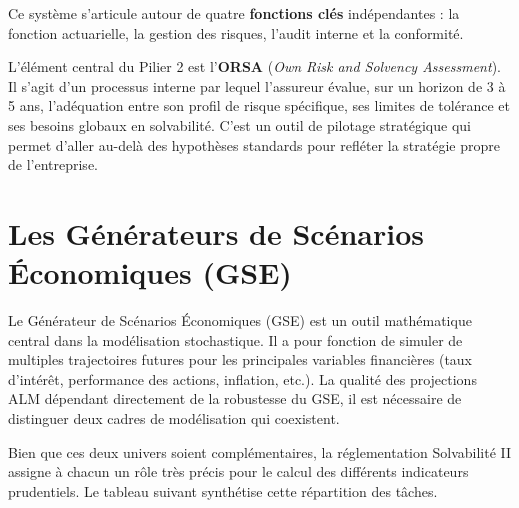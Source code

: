 Ce système s'articule autour de quatre \textbf{fonctions clés} indépendantes : la fonction actuarielle, la gestion des risques, l'audit interne et la conformité.



L'élément central du Pilier 2 est l'\textbf{ORSA} (\textit{Own Risk and Solvency Assessment}). Il s'agit d'un processus interne par lequel l'assureur évalue, sur un horizon de 3 à 5 ans, l'adéquation entre son profil de risque spécifique, ses limites de tolérance et ses besoins globaux en solvabilité. C'est un outil de pilotage stratégique qui permet d'aller au-delà des hypothèses standards pour refléter la stratégie propre de l'entreprise.

\section{Les Générateurs de Scénarios Économiques (GSE)}
\label{sec:gse}

Le Générateur de Scénarios Économiques (GSE) est un outil mathématique central dans la modélisation stochastique. Il a pour fonction de simuler de multiples trajectoires futures pour les principales variables financières (taux d'intérêt, performance des actions, inflation, etc.). La qualité des projections ALM dépendant directement de la robustesse du GSE, il est nécessaire de distinguer deux cadres de modélisation qui coexistent.

Bien que ces deux univers soient complémentaires, la réglementation Solvabilité II assigne à chacun un rôle très précis pour le calcul des différents indicateurs prudentiels. Le tableau suivant synthétise cette répartition des tâches.

